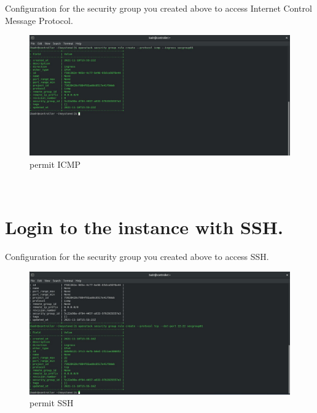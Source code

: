 \begin{spacing}{1.2}
\par Configuration for the security group you created above to access Internet Control Message Protocol.
\\
\begin{figure}[!htb] 
\begin{center} 
\includegraphics[width=1\linewidth]{Cloud/Creating and Running Instances/permit ICMP} 
\end{center} 
\caption{permit ICMP} 
\end{figure} 
\FloatBarrier
\\
\section{Login to the instance with SSH.}

\par Configuration for the security group you created above to access SSH.
\\
\begin{figure}[!htb] 
\begin{center} 
\includegraphics[width=1\linewidth]{Cloud/Creating and Running Instances/permit SSH} 
\end{center} 
\caption{permit SSH} 
\end{figure} 
\FloatBarrier
\\


\end{spacing}